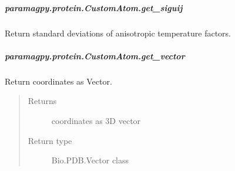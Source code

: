 \documentclass[a4paper,10pt,english,openany,oneside]{sphinxmanual}
\begin{document}
\begin{fulllineitems}
\begin{fulllineitems}
\begin{fulllineitems}
\end{fulllineitems}



\subparagraph{paramagpy.protein.CustomAtom.get\_siguij}
\label{\detokenize{reference/generated/paramagpy.protein.CustomAtom.get_siguij:paramagpy-protein-customatom-get-siguij}}\label{\detokenize{reference/generated/paramagpy.protein.CustomAtom.get_siguij::doc}}

\begin{fulllineitems}
\label{\detokenize{reference/generated/paramagpy.protein.CustomAtom.get_siguij:paramagpy.protein.CustomAtom.get_siguij}}
\sphinxAtStartPar
Return standard deviations of anisotropic temperature factors.

\end{fulllineitems}



\subparagraph{paramagpy.protein.CustomAtom.get\_vector}
\label{\detokenize{reference/generated/paramagpy.protein.CustomAtom.get_vector:paramagpy-protein-customatom-get-vector}}\label{\detokenize{reference/generated/paramagpy.protein.CustomAtom.get_vector::doc}}

\begin{fulllineitems}
\label{\detokenize{reference/generated/paramagpy.protein.CustomAtom.get_vector:paramagpy.protein.CustomAtom.get_vector}}
\sphinxAtStartPar
Return coordinates as Vector.
\begin{quote}\begin{description}
\item[{Returns}] \leavevmode
\sphinxAtStartPar
coordinates as 3D vector

\item[{Return type}] \leavevmode
\sphinxAtStartPar
Bio.PDB.Vector class

\end{description}\end{quote}

\end{fulllineitems}




\end{fulllineitems}
\end{fulllineitems}
\end{document}
